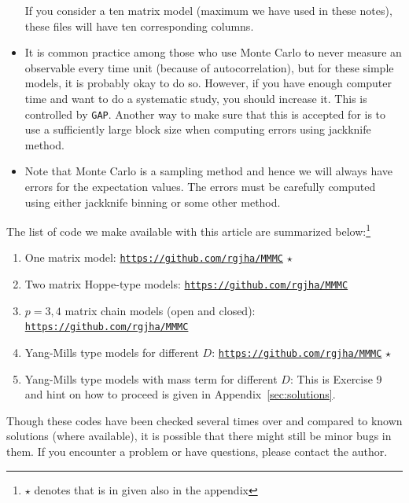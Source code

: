 \documentclass[11pt]{article}
\begin{document}
\begin{itemize}
If you consider a ten matrix model (maximum we have used in these notes),
these files will have ten corresponding columns. 
\item It is common practice among those who use Monte Carlo to never measure an observable every time unit (because of autocorrelation), but for these simple models, it is probably okay to do so. However, if you
have enough computer time and want to do a systematic study, you should increase it. This is controlled by \texttt{GAP}. Another way to make sure that this is accepted for is to use a sufficiently large block size when computing errors using jackknife method. 
\item Note that Monte Carlo is a sampling method and hence we will always have errors for the expectation values. The errors must be carefully computed using either jackknife binning or some other method. 
\end{itemize} 

The list of code we make available with this article are summarized below:\footnote{$\star$ denotes that is in given also in the appendix}
\begin{enumerate}
\item One matrix model: \texttt{\href{https://github.com/rgjha/MMMC}{https://github.com/rgjha/MMMC}}  ${\star}$
\item Two matrix Hoppe-type models: \texttt{\href{https://github.com/rgjha/MMMC}{https://github.com/rgjha/MMMC}}  
\item $p=3,4$ matrix chain models (open and closed): \texttt{\href{https://github.com/rgjha/MMMC}{https://github.com/rgjha/MMMC}}
\item Yang-Mills type models for different $D$: \texttt{\href{https://github.com/rgjha/MMMC}{https://github.com/rgjha/MMMC}} ${\star}$
\item Yang-Mills type models with mass term for different $D$: This is Exercise 9 and hint on how to proceed 
is given in Appendix~\ref{sec:solutions}.
\end{enumerate}
Though these codes have been checked several times over 
and compared to known solutions (where available), it is possible 
that there might still be minor bugs in them. If you encounter a problem or 
have questions, please contact the author. 
\end{document}
